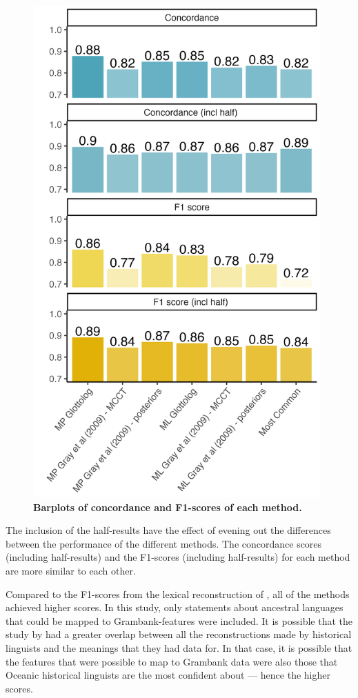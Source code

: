 \documentclass[a4paper,10pt]{article} %
\begin{document}
\begin{figure}[H]
\centering
\includegraphics[width=11cm]{illustrations/plots_from_R/results/barplot_facet_scores.png}
\caption{\textbf{Barplots of concordance and F1-scores of each method.}}
\label{barplot_facet_results}
\end{figure}

The inclusion of the half-results have the effect of evening out the differences between the performance of the different methods. The concordance scores (including half-results) and the F1-scores (including half-results) for each method are more similar to each other.

Compared to the F1-scores from the lexical reconstruction of \citet{jager2018using}, all of the methods achieved higher scores. In this study, only statements about ancestral languages that could be mapped to Grambank-features were included. It is  possible that the study by \citet{jager2018using} had a greater overlap between all the reconstructions made by historical linguists and the meanings that they had data for. In that case, it is possible that the features that were possible to map to Grambank data were also those that Oceanic historical linguists are the most confident about --- hence the higher scores.
\end{document}
